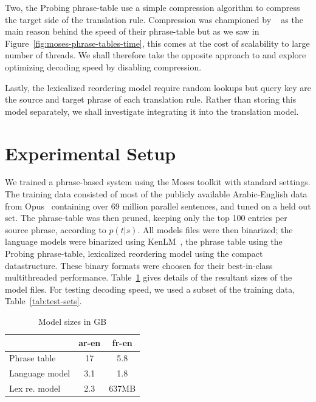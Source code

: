 \documentclass[11pt]{article}
\begin{document}
Two, the Probing phrase-table use a simple compression algorithm to compress the target side of the translation rule. Compression was championed by ~ as the main reason behind the speed of their phrase-table but as we saw in Figure~\ref{fig:moses-phrase-tables-time}, this comes at the cost of scalability to large number of threads. We shall therefore take the opposite approach to and explore optimizing decoding speed by disabling compression.

Lastly, the lexicalized reordering model require random lookups but query key are the source and target phrase of each translation rule. Rather than storing this model separately, we shall investigate integrating it into the translation model.

\section{Experimental Setup}

We trained a phrase-based system using the Moses toolkit with standard settings. The training data consisted of most of the publicly available Arabic-English data from Opus~\cite{tiedemann2012parallel} containing over 69 million parallel sentences, and tuned on a held out set. The phrase-table was then pruned, keeping only the top 100 entries per source phrase, according to $p(t|s)$. All models files were then binarized; the language models were binarized using KenLM~\cite{Heafield-kenlm}, the phrase table using the Probing phrase-table, lexicalized reordering model using the compact datastructure. These binary formats were choosen for their best-in-class multithreaded performance. Table~\ref{tab:model-files} gives details of the resultant sizes of the model files. For testing decoding speed, we used a subset of the training data, Table~\ref{tab:test-sets}. 
\begin{table}[h]
\begin{center}
\begin{tabular}{|l|c|c|} \hline
		& ar-en	& fr-en \\ \hline
Phrase table  	& 17 	& 5.8 \\
Language model 	& 3.1  	& 1.8 \\ 
Lex re. model	& 2.3	& 637MB \\ \hline
\end{tabular}
\end{center}
\caption{Model sizes in GB}
\label{tab:model-files}
\end{table}
\end{document}
